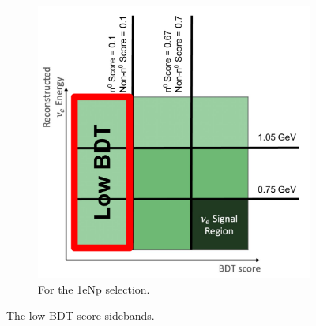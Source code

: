 \begin{figure}[H]
\begin{subfigure}{0.5\linewidth}
        \includegraphics[width=\linewidth]{technote/Sidebands/Figures/FarSideband/NpLowBDTSideband.pdf}
        \caption{For the 1eNp selection.}
    \end{subfigure}
    \caption{The low BDT score sidebands.}
    \label{fig:LowBDTSideband}
\end{figure}

